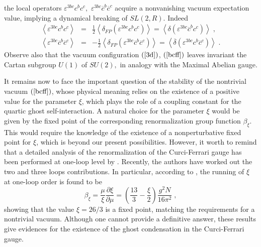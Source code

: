 \documentclass[a4paper,12pt]{article}
\begin{document}
the local operators $\varepsilon ^{3bc}c^{b}c^{c},$ $\varepsilon ^{3bc}%
\overline{c}^{b}\overline{c}^{c}$ acquire a nonvanishing vacuum expectation
value, implying a dynamical breaking of $SL(2,R)$. Indeed 
\begin{eqnarray}
\left\langle \varepsilon ^{3bc}c^{b}c^{c}\right\rangle  &=&\frac{1}{2}
\left\langle \delta _{FP}\left( \varepsilon ^{3bc}c^{b}c^{c}\right)
\right\rangle =\left\langle \delta \left( \varepsilon ^{3bc}\overline{c}%
^{b}c^{c}\right) \right\rangle \;,  \label{br} \\
\left\langle \varepsilon ^{3bc}\overline{c}^{b}\overline{c}^{c}\right\rangle
&=&-\frac{1}{2}\left\langle \delta _{FP}\left( \varepsilon ^{3bc}\overline{c}%
^{b}\overline{c}^{c}\right) \right\rangle =\left\langle \overline{\delta }%
\left( \varepsilon ^{3bc}c^{b}\overline{c}^{c}\right) \right\rangle \;. 
\nonumber
\end{eqnarray}
Observe also that the vacuum configuration $\left( \ref{3d}\right) $, $%
\left( \ref{bcff}\right) $ leaves invariant the Cartan subgroup $U(1)$ of $%
SU(2),$ in analogy with the Maximal Abelian gauge.

It remains now to face the important question of the stability of the
nontrivial vacuum $\left( \ref{bcff}\right) $, whose physical meaning relies
on the existence of a positive value for the parameter $\xi $, which plays
the role of a coupling constant for the quartic ghost self-interaction. A
natural choice for the parameter $\xi $ would be given by the fixed point of
the corresponding renormalization group function $\beta _{\xi }$. This would
require the knowledge of the existence of a nonperturbative fixed point for $%
\xi $, which is beyond our present possibilities. However, it worth to
remind that a detailed analysis of the renormalization of the Curci-Ferrari
gauge has been performed at one-loop level by \cite{mr}. Recently, the
authors \cite{mr1} have worked out the two and three loops contributions. In
particular, according to \cite{mr,mr1}, the running of $\xi $ at one-loop
order is found to be 
\begin{equation}
\beta _{\xi }=\frac{\mu }{\xi }\frac{\partial \xi }{\partial \mu }=\left( 
\frac{13}{3}-\frac{\xi }{2}\right) \frac{g^{2}N}{16\pi ^{2}}\;,  \label{ba}
\end{equation}
showing that the value $\xi =26/3$ is a fixed point, matching the
requirements for a nontrivial vacuum. Although one cannot provide a
definitive answer, these results give evidences for the existence of the
ghost condensation in the Curci-Ferrari gauge.
\end{document}
